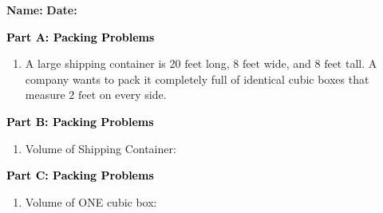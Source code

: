 \documentclass[12pt, letterpaper, fleqn]{article}
\newcommand{\blanklong}{\underline{\hspace{6.5cm}}}
\begin{document}
\textbf{Name:} \underline{\hspace{5cm}}
\hfill
\textbf{Date:} \underline{\hspace{3cm}}\\

\begin{tcolorbox}[colback=customteal!20]
\large\textcolor{black}{\textbf{Part A: Packing Problems}}
\end{tcolorbox}

\vspace{3mm}

\begin{enumerate}[itemsep=5.5cm, leftmargin=0.6cm]
\item A large shipping container is $20\text{ feet}$ long, $8\text{ feet}$ wide, and $8\text{ feet}$ tall. A company wants to pack it completely full of identical cubic boxes that measure $2\text{ feet}$ on every side.
\end{enumerate}

\newpage

\begin{tcolorbox}[colback=customteal!20]
\large\textcolor{black}{\textbf{Part B: Packing Problems}}
\end{tcolorbox}

\vspace{3mm}

\begin{enumerate}[itemsep=5.5cm, leftmargin=0.6cm, resume]
\item Volume of Shipping Container: \blanklong
\end{enumerate}

\newpage

\begin{tcolorbox}[colback=customteal!20]
\large\textcolor{black}{\textbf{Part C: Packing Problems}}
\end{tcolorbox}

\vspace{3mm}

\begin{enumerate}[itemsep=5.5cm, leftmargin=0.6cm, resume]
\item Volume of ONE cubic box: \blanklong
\end{enumerate}

\newpage
\end{document}
